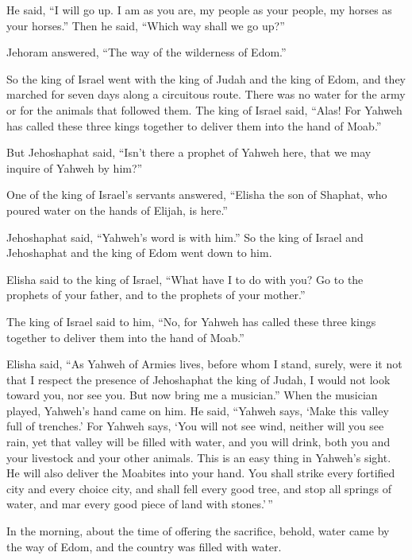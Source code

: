 He said, ``I will go up. I am as you are, my people as your people, my
horses as your horses.''  Then he said, ``Which way shall we
go up?''

Jehoram answered, ``The way of the wilderness of Edom.''

 So the king of Israel went with the king of Judah and the
king of Edom, and they marched for seven days along a circuitous route.
There was no water for the army or for the animals that followed them.
 The king of Israel said, ``Alas! For Yahweh has called
these three kings together to deliver them into the hand of Moab.''

 But Jehoshaphat said, ``Isn't there a prophet of Yahweh
here, that we may inquire of Yahweh by him?''

One of the king of Israel's servants answered, ``Elisha the son of
Shaphat, who poured water on the hands of Elijah, is here.''

 Jehoshaphat said, ``Yahweh's word is with him.'' So the
king of Israel and Jehoshaphat and the king of Edom went down to him.

 Elisha said to the king of Israel, ``What have I to do
with you? Go to the prophets of your father, and to the prophets of your
mother.''

The king of Israel said to him, ``No, for Yahweh has called these three
kings together to deliver them into the hand of Moab.''

 Elisha said, ``As Yahweh of Armies lives, before whom I
stand, surely, were it not that I respect the presence of Jehoshaphat
the king of Judah, I would not look toward you, nor see you.
 But now bring me a musician.'' When the musician played,
Yahweh's hand came on him.  He said, ``Yahweh says, `Make
this valley full of trenches.'  For Yahweh says, `You will
not see wind, neither will you see rain, yet that valley will be filled
with water, and you will drink, both you and your livestock and your
other animals.  This is an easy thing in Yahweh's sight. He
will also deliver the Moabites into your hand.  You shall
strike every fortified city and every choice city, and shall fell every
good tree, and stop all springs of water, and mar every good piece of
land with stones.'\,''

 In the morning, about the time of offering the sacrifice,
behold, water came by the way of Edom, and the country was filled with
water.

